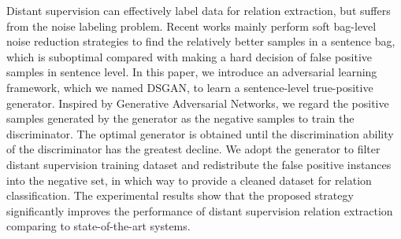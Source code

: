 Distant supervision can effectively label data for relation extraction, but suffers from the noise labeling problem. Recent works mainly perform soft bag-level noise reduction strategies to find the relatively better samples in a sentence bag, which is suboptimal compared with making a hard decision of false positive samples in sentence level. In this paper, we introduce an adversarial learning framework, which we named DSGAN, to learn a sentence-level true-positive generator. Inspired by Generative Adversarial Networks, we regard the positive samples generated by the generator as the negative samples to train the discriminator. The optimal generator is obtained until the discrimination ability of the discriminator has the greatest decline. We adopt the generator to filter distant supervision training dataset and redistribute the false positive instances into the negative set, in which way to provide a cleaned dataset for relation classification. The experimental results show that the proposed strategy significantly improves the performance of distant supervision relation extraction comparing to state-of-the-art systems.
